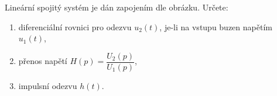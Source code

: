 \begin{mdframed}[style=mdexam]
  \begin{example}\label{tky:exam002}
    Lineární spojitý systém je dán zapojením dle obrázku. Určete:
    \begin{enumerate}[leftmargin=12pt,noitemsep]
      \item diferenciální rovnici pro odezvu $u_2(t)$, je-li na vstupu buzen napětím $u_1(t)$,
      \item přenos napětí $H(p)=\dfrac{U_2(p)}{U_1(p)}$,
      \item impulsní odezvu $h(t)$.
    \end{enumerate}


\end{example}
\end{mdframed}
